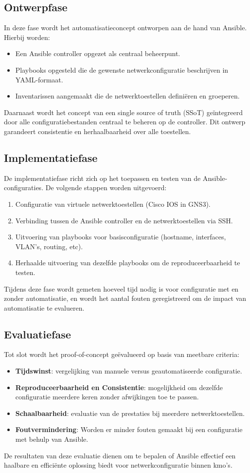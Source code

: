 \subsection{Ontwerpfase}
In deze fase wordt het automatisatieconcept ontworpen aan de hand van Ansible. Hierbij worden:
\begin{itemize}
  \item Een Ansible controller opgezet als centraal beheerpunt.
  \item Playbooks opgesteld die de gewenste netwerkconfiguratie beschrijven in YAML-formaat.
  \item Inventarissen aangemaakt die de netwerktoestellen definiëren en groeperen.
\end{itemize}
Daarnaast wordt het concept van een single source of truth (SSoT) geïntegreerd door alle configuratiebestanden centraal te beheren op de controller. Dit ontwerp garandeert consistentie en herhaalbaarheid over alle toestellen.

\subsection{Implementatiefase}
De implementatiefase richt zich op het toepassen en testen van de Ansible-configuraties. De volgende stappen worden uitgevoerd:
\begin{enumerate}
  \item Configuratie van virtuele netwerktoestellen (Cisco IOS in GNS3).
  \item Verbinding tussen de Ansible controller en de netwerktoestellen via SSH.
  \item Uitvoering van playbooks voor basisconfiguratie (hostname, interfaces, VLAN's, routing, etc).
  \item Herhaalde uitvoering van dezelfde playbooks om de reproduceerbaarheid te testen.
\end{enumerate}
Tijdens deze fase wordt gemeten hoeveel tijd nodig is voor configuratie met en zonder automatisatie, en wordt het aantal fouten geregistreerd om de impact van automatisatie te evalueren.

\subsection{Evaluatiefase}
Tot slot wordt het proof-of-concept geëvalueerd op basis van meetbare criteria:
\begin{itemize}
  \item \textbf{Tijdswinst}: vergelijking van manuele versus geautomatiseerde configuratie.
  \item \textbf{Reproduceerbaarheid en Consistentie}: mogelijkheid om dezelfde configuratie meerdere keren zonder afwijkingen toe te passen.
  \item \textbf{Schaalbaarheid}: evaluatie van de prestaties bij meerdere netwerktoestellen.
  \item \textbf{Foutvermindering}: Worden er minder fouten gemaakt bij een configuratie met behulp van Ansible.

\end{itemize}
De resultaten van deze evaluatie dienen om te bepalen of Ansible effectief een haalbare en efficiënte oplossing biedt voor netwerkconfiguratie binnen kmo's.


